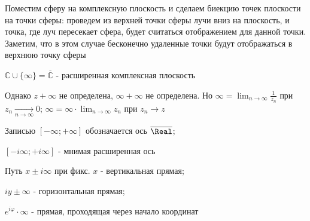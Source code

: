 Поместим сферу на комплексную плоскость и сделаем биекцию точек плоскости на точки сферы: проведем из верхней точки сферы лучи вниз на плоскость, и точка, где луч пересекает сфера,
будет считаться отображением для данной точки. Заметим, что в этом случае бесконечно удаленные точки будут отображаться в верхнюю точку сферы

\Def $\mathbb{C} \cup \{\infty\} = \overline{\mathbb{C}}$ - расширенная комплексная плоскость

Однако $z + \infty$ не определена, $\infty + \infty$ не определена. 
Но $\infty = \lim_{n \to \infty} \frac{1}{z_n}$ при $z_n \underset{n \to \infty}{\longrightarrow} 0$; $\infty = \infty \cdot \lim_{n \to \infty} z_n$ при $z_n \longrightarrow z$

Записью $[-\infty; +\infty]$ обозначается ось $\overline{\Real}$; 

\qquad\qquad $[-i\infty; +i\infty]$ - мнимая расширенная ось

Путь $x \pm i \infty$ при фикс. $x$ - вертикальная прямая; 

\qquad\qquad $iy \pm \infty$ - горизонтальная прямая; 

\qquad\qquad $e^{i\varphi} \cdot \infty$ - прямая, проходящая через начало координат


